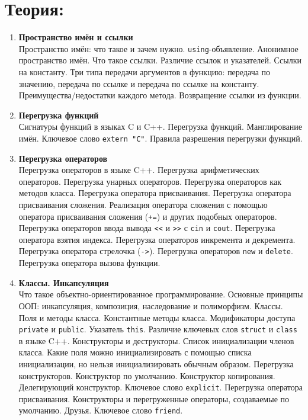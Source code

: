 \documentclass{article}
\begin{document}

\section*{Теория:}
\begin{enumerate}

\item \textbf{Пространство имён и ссылки}\\
Пространство имён: что такое и зачем нужно. \texttt{using}-объявление. Анонимное пространство имён. Что такое ссылки. Различие ссылок и указателей. Ссылки на константу. Три типа передачи аргументов в функцию: передача по значению, передача по ссылке и передача по ссылке на константу. Преимущества/недостатки каждого метода. Возвращение ссылки из функции.   



\item  \textbf{Перегрузка функций}\\
Сигнатуры функций в языках C и C++. Перегрузка функций. Манглирование имён. Ключевое слово \texttt{extern "C"}. Правила разрешения перегрузки функций. 


\item \textbf{Перегрузка операторов}\\
Перегрузка операторов в языке C++. Перегрузка арифметических операторов. Перегрузка унарных операторов. Перегрузка операторов как методов класса. Перегрузка оператора присваивания. Перегрузка оператора присваивания сложения. Реализация оператора сложения с помощью оператора присваивания сложения (\texttt{+=}) и других подобных операторов. Перегрузка операторов ввода вывода \verb|<<| и \verb|>>| с \texttt{cin} и \texttt{cout}. Перегрузка оператора взятия индекса. Перегрузка операторов инкремента и декремента. Перегрузка оператора стрелочка (\texttt{->}). Перегрузка операторов \texttt{new} и \texttt{delete}. Перегрузка оператора вызова функции.

\item  \textbf{Классы. Инкапсуляция}\\
Что такое объектно-ориентированное программирование. Основные принципы ООП: инкапсуляция, композиция, наследование и полиморфизм. Классы. Поля и методы класса. Константные методы класса. Модификаторы доступа \texttt{private} и \texttt{public}.  Указатель \texttt{this}.  Различие ключевых слов \texttt{struct} и \texttt{class} в языке C++. Конструкторы и деструкторы. Список инициализации членов класса. Какие поля можно инициализировать с помощью списка инициализации, но нельзя инициализировать обычным образом. Перегрузка конструкторов. Конструктор по умолчанию. Конструктор копирования. Делегирующий конструктор. Ключевое слово \texttt{explicit}. Перегрузка оператора присваивания. Конструкторы и перегруженные операторы, создаваемые по умолчанию.
Друзья. Ключевое слово \texttt{friend}. 


\end{enumerate}
\end{document}

